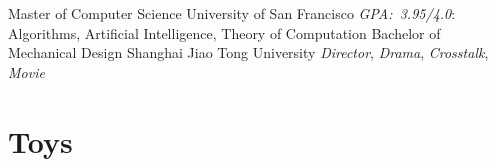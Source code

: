 \documentclass[]{friggeri-cv} %
\begin{document}
\begin{entrylist}
  {Master \textnormal{of Computer Science}}
  {University of San Francisco}
  {
    \emph{GPA:~3.95/4.0}: Algorithms, Artificial Intelligence, Theory of Computation
  }
  {Bachelor \textnormal{of Mechanical Design}}
  {Shanghai Jiao Tong University}
  {
    \emph{Director}, \emph{Drama}, \emph{Crosstalk}, \emph{Movie}
  }
\end{entrylist}


\section{Toys}
\end{document}
